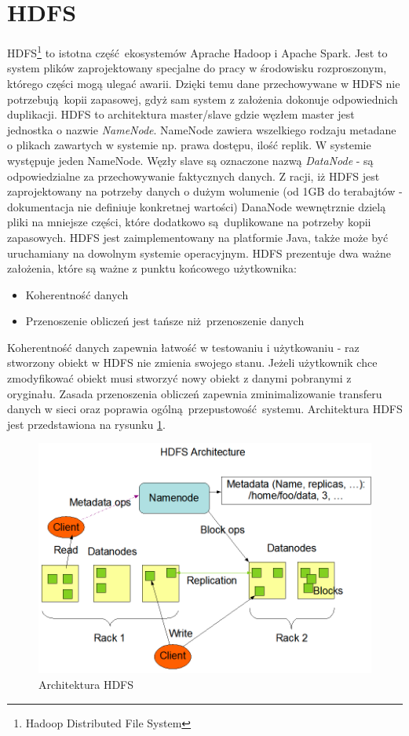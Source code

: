 \section{HDFS}
HDFS\footnote{Hadoop Distributed File System} to istotna część ekosystemów Aprache Hadoop i Apache Spark. Jest to system plików zaprojektowany specjalne do pracy w środowisku rozproszonym, którego części mogą ulegać awarii. Dzięki temu dane przechowywane w HDFS nie potrzebują kopii zapasowej, gdyż sam system z założenia dokonuje odpowiednich duplikacji. HDFS to architektura master/slave gdzie węzłem master jest jednostka o nazwie \textit{NameNode}. NameNode zawiera wszelkiego rodzaju metadane o plikach zawartych w systemie np. prawa dostępu, ilość replik. W systemie występuje jeden NameNode. Węzły slave są oznaczone nazwą \textit{DataNode} - są odpowiedzialne za przechowywanie faktycznych danych. Z racji, iż HDFS jest zaprojektowany na potrzeby danych o dużym wolumenie (od 1GB do terabajtów - dokumentacja nie definiuje konkretnej wartości) DanaNode wewnętrznie dzielą pliki na mniejsze części, które dodatkowo są duplikowane na potrzeby kopii zapasowych. HDFS jest zaimplementowany na platformie Java, także może być uruchamiany na dowolnym systemie operacyjnym. HDFS prezentuje dwa ważne założenia, które są ważne z punktu końcowego użytkownika:
\begin{itemize}
	\item Koherentność danych
	\item Przenoszenie obliczeń jest tańsze niż przenoszenie danych
\end{itemize}
Koherentność danych zapewnia łatwość w testowaniu i użytkowaniu - raz stworzony obiekt w HDFS nie zmienia swojego stanu. Jeżeli użytkownik chce zmodyfikować obiekt musi stworzyć nowy obiekt z danymi pobranymi z oryginału. Zasada przenoszenia obliczeń zapewnia zminimalizowanie transferu danych w sieci oraz poprawia ogólną przepustowość systemu.\cite{HDFS} Architektura HDFS jest przedstawiona na rysunku \ref{fig:@=hdfs_architecture}.\cite{HDFS_architecture}
\begin{figure}
	\centering
	\includegraphics[scale=0.3]{hdfsarchitecture.png}
	\caption{Architektura HDFS}
	\label{fig:@=hdfs_architecture}
\end{figure}
